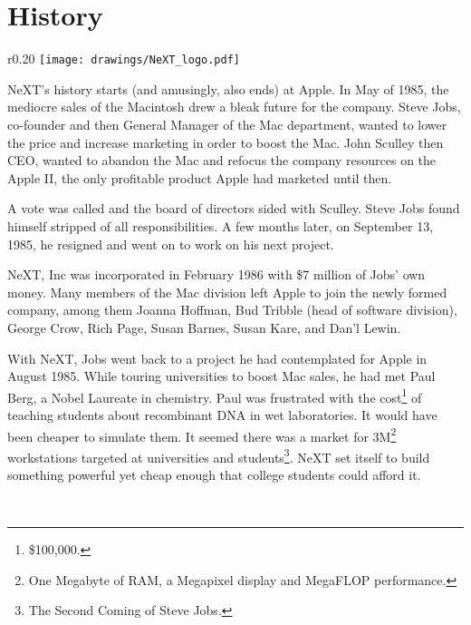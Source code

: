 \section{History}

\begin{wrapfigure}[8]{r}{0.20\textwidth}
\centering
\texttt{[image: drawings/NeXT\_logo.pdf]}
\end{wrapfigure}
\par
NeXT's history starts (and amusingly, also ends) at Apple. In May of 1985, the mediocre sales of the Macintosh drew a bleak future for the company. Steve Jobs, co-founder and then General Manager of the Mac department, wanted to lower the price and increase marketing in order to boost the Mac. John Sculley then CEO, wanted to abandon the Mac and refocus the company resources on the Apple II, the only profitable product Apple had marketed until then.\\
\par
 A vote was called and the board of directors sided with Sculley. Steve Jobs found himself stripped of all responsibilities. A few months later, on September 13, 1985, he resigned and went on to work on his next project.\\
\par
NeXT, Inc was incorporated in February 1986 with \$7 million of Jobs' own money. Many members of the Mac division left Apple to join the newly formed company, among them  Joanna Hoffman, Bud Tribble (head of software division), George Crow, Rich Page, Susan Barnes, Susan Kare, and Dan'l Lewin.\\ 
\par
With NeXT, Jobs went back to a project he had contemplated for Apple in August 1985. While touring universities to boost Mac sales, he had met Paul Berg, a Nobel Laureate in chemistry. Paul was frustrated with the cost\footnote{\$100,000.} of teaching students about recombinant DNA in wet laboratories. It would have been cheaper to simulate them. It seemed there was a market for 3M\footnote{One Megabyte of RAM, a Megapixel display and MegaFLOP performance.} workstations targeted at universities and students\footnote{The Second Coming of Steve Jobs.}. NeXT set itself to build something powerful yet cheap enough that college students could afford it.\\
\par
{}\\
\par
